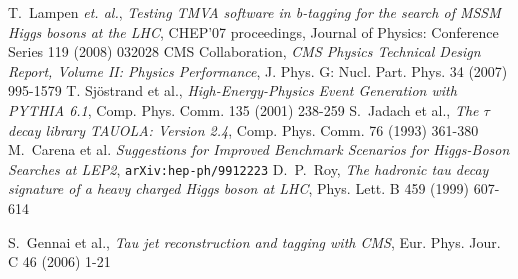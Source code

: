 \documentclass[a4paper]{jpconf}
\begin{document}
\begin{thebibliography}{9}

 T.~Lampen {\em et. al.}, \emph{Testing TMVA software in b-tagging 
                  for the search of MSSM Higgs bosons at the LHC},
CHEP’07 proceedings, Journal of Physics: Conference Series 119 (2008) 032028
 {CMS Collaboration}, \emph{{CMS} Physics Technical Design Report, Volume {II}:
             Physics Performance}, J. Phys. G: Nucl. Part. Phys. 34 (2007) 995-1579
 T. Sj\"ostrand et al., \emph{High-Energy-Physics
  Event Generation with {PYTHIA} 6.1}, Comp. Phys. Comm. 135 (2001) 238-259
 S.~Jadach et al., \emph{The $\tau$ decay library
  {TAUOLA}: Version 2.4}, Comp. Phys. Comm. 76 (1993) 361-380
 M.~Carena et al. \emph{Suggestions for Improved Benchmark Scenarios for Higgs-Boson Searches at LEP2}, 
{\tt arXiv:hep-ph/9912223} %
 D.~P.~Roy, \emph{The hadronic tau decay signature of a heavy charged Higgs
              boson at {LHC}}, Phys. Lett. B 459 (1999) 607-614

 S.~Gennai et al., \emph{Tau jet reconstruction
  and tagging with {CMS}}, Eur. Phys. Jour. C 46 (2006) 1-21


\end{thebibliography}
\end{document}
